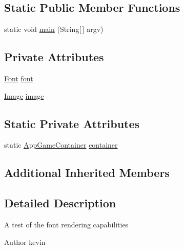 \subsection*{Static Public Member Functions}
\begin{DoxyCompactItemize}
\item 
static void \mbox{\hyperlink{classorg_1_1newdawn_1_1slick_1_1tests_1_1_pure_font_test_af075b56a41973e4024f3ef30d9ac789f}{main}} (String\mbox{[}$\,$\mbox{]} argv)
\end{DoxyCompactItemize}
\subsection*{Private Attributes}
\begin{DoxyCompactItemize}
\item 
\mbox{\hyperlink{interfaceorg_1_1newdawn_1_1slick_1_1_font}{Font}} \mbox{\hyperlink{classorg_1_1newdawn_1_1slick_1_1tests_1_1_pure_font_test_a6a077c1e23810818363d7a01a69ddd82}{font}}
\item 
\mbox{\hyperlink{classorg_1_1newdawn_1_1slick_1_1_image}{Image}} \mbox{\hyperlink{classorg_1_1newdawn_1_1slick_1_1tests_1_1_pure_font_test_abf4f2b16a8b53a263efe45591327f0b0}{image}}
\end{DoxyCompactItemize}
\subsection*{Static Private Attributes}
\begin{DoxyCompactItemize}
\item 
static \mbox{\hyperlink{classorg_1_1newdawn_1_1slick_1_1_app_game_container}{App\+Game\+Container}} \mbox{\hyperlink{classorg_1_1newdawn_1_1slick_1_1tests_1_1_pure_font_test_afb97856ff89ea6b4957e845fcba255fe}{container}}
\end{DoxyCompactItemize}
\subsection*{Additional Inherited Members}


\subsection{Detailed Description}
A test of the font rendering capabilities

\begin{DoxyAuthor}{Author}
kevin 
\end{DoxyAuthor}


